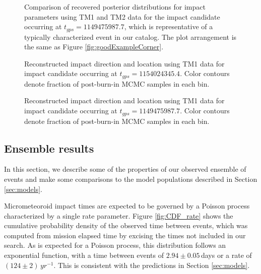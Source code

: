 \documentclass[twocolumn, trackchanges]{aastex62}
\begin{document}
\begin{figure}[ht!]
\vspace*{-20mm}
\caption{Comparison of recovered posterior distributions for impact parameters using TM1 and TM2 data for the impact candidate occurring at $t_{gps}=1149475987.7$, which is representative of a typically characterized event in our catalog. The plot arrangement is the same as Figure \ref{fig:goodExampleCorner}.\label{fig:typExampleCorner}}
\end{figure}

\begin{figure}[h!]
\caption{Reconstructed impact direction and location using TM1 data for impact candidate occurring at $t_{gps}=1154024345.4$. Color contours denote fraction of post-burn-in MCMC samples in each bin.\label{fig:goodExampleLocation}}
\end{figure}

\begin{figure}[h!]
\caption{Reconstructed impact direction and location using TM1 data for impact candidate occurring at $t_{gps}=1149475987.7$. Color contours denote fraction of post-burn-in MCMC samples in each bin.\label{fig:typExampleLocation}}
\end{figure}


\subsection{Ensemble results}
In this section, we describe some of the properties of our observed ensemble of events and make some comparisons to the model populations described in Section \ref{sec:models}. 

Micrometeoroid impact times are expected to be governed by a Poisson process characterized by a single rate parameter.  Figure \ref{fig:CDF_rate} shows the cumulative probability density of the observed time between events, which was computed from mission elapsed time by excising the times not included in our search. As is expected for a Poisson process, this distribution follows an exponential function, with a time between events of $2.94\pm0.05\,$days or a rate of $(124\pm2)\,yr^{-1}$.  This is consistent with the predictions in Section \ref{sec:models}.
\end{document}
